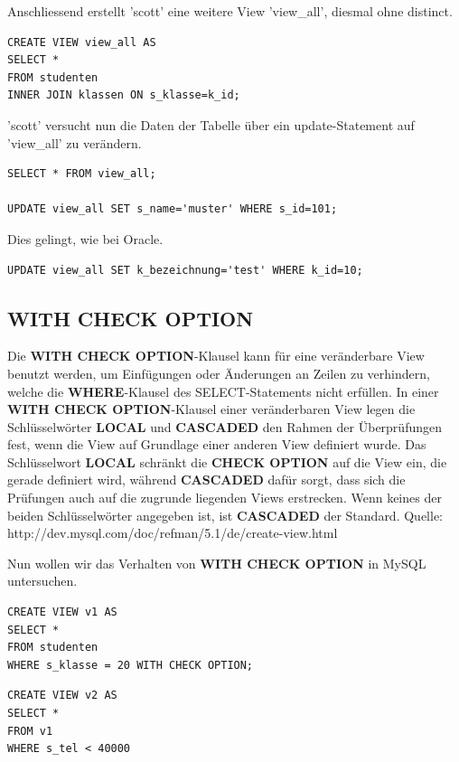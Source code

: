 \documentclass[10pt]{scrreprt}
\newcommand{\Bold}[1]{\textbf{#1}} %
\begin{document}
Anschliessend erstellt 'scott' eine weitere View 'view\_all', diesmal ohne distinct.
\begin{lstlisting}[style=sql]
CREATE VIEW view_all AS
SELECT *
FROM studenten
INNER JOIN klassen ON s_klasse=k_id;
\end{lstlisting}
'scott' versucht nun die Daten der Tabelle über ein update-Statement auf 'view\_all' zu verändern.
\begin{lstlisting}[style=sql]
SELECT * FROM view_all;

UPDATE view_all SET s_name='muster' WHERE s_id=101;
\end{lstlisting}
Dies gelingt, wie bei Oracle.

\begin{lstlisting}[style=sql]
UPDATE view_all SET k_bezeichnung='test' WHERE k_id=10;
\end{lstlisting}

\subsection{WITH CHECK OPTION}
Die \Bold{WITH CHECK OPTION}-Klausel kann für eine veränderbare View benutzt werden, um Einfügungen oder Änderungen an Zeilen zu verhindern, welche die \Bold{WHERE}-Klausel des SELECT-Statements nicht erfüllen.
In einer \Bold{WITH CHECK OPTION}-Klausel einer veränderbaren View legen die Schlüsselwörter \Bold{LOCAL} und \Bold{CASCADED} den Rahmen der Überprüfungen fest, wenn die View auf Grundlage einer anderen View definiert wurde. Das Schlüsselwort \Bold{LOCAL} schränkt die \Bold{CHECK OPTION} auf die View ein, die gerade definiert wird, während \Bold{CASCADED} dafür sorgt, dass sich die Prüfungen auch auf die zugrunde liegenden Views erstrecken. Wenn keines der beiden Schlüsselwörter angegeben ist, ist \Bold{CASCADED} der Standard.\newline\newline
\small{Quelle: http://dev.mysql.com/doc/refman/5.1/de/create-view.html}\newline\newline

Nun wollen wir das Verhalten von \Bold{WITH CHECK OPTION} in MySQL untersuchen.
\begin{lstlisting}[style=sql]
CREATE VIEW v1 AS
SELECT *
FROM studenten
WHERE s_klasse = 20 WITH CHECK OPTION;
\end{lstlisting}

\begin{lstlisting}[style=sql]
CREATE VIEW v2 AS
SELECT *
FROM v1
WHERE s_tel < 40000
\end{lstlisting}
\end{document}
